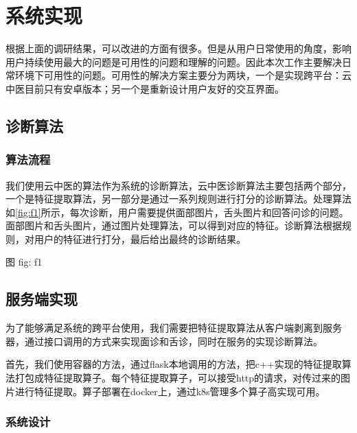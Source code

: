 \chapter{系统实现}
根据上面的调研结果，可以改进的方面有很多。但是从用户日常使用的角度，影响用户持续使用最大的问题是可用性的问题和理解的问题。因此本次工作主要解决日常环境下可用性的问题。可用性的解决方案主要分为两块，一个是实现跨平台：云中医目前只有安卓版本；另一个是重新设计用户友好的交互界面。

\section{诊断算法}

\subsection{算法流程}
我们使用云中医的算法作为系统的诊断算法，云中医诊断算法主要包括两个部分，一个是特征提取算法，另一部分是通过一系列规则进行打分的诊断算法。处理算法如\ref{fig:f1}所示，每次诊断，用户需要提供面部图片，舌头图片和回答问诊的问题。面部图片和舌头图片，通过图片处理算法，可以得到对应的特征。诊断算法根据规则，对用户的特征进行打分，最后给出最终的诊断结果。

图 fig: f1

\section{服务端实现}
为了能够满足系统的跨平台使用，我们需要把特征提取算法从客户端剥离到服务器，通过接口调用的方式来实现面诊和舌诊，同时在服务的实现诊断算法。

首先，我们使用容器的方法，通过flask本地调用的方法，把c++实现的特征提取算法打包成特征提取算子。每个特征提取算子，可以接受http的请求，对传过来的图片进行特征提取。算子部署在docker上，通过k8s管理多个算子高实现可用。

\subsection{系统设计}



